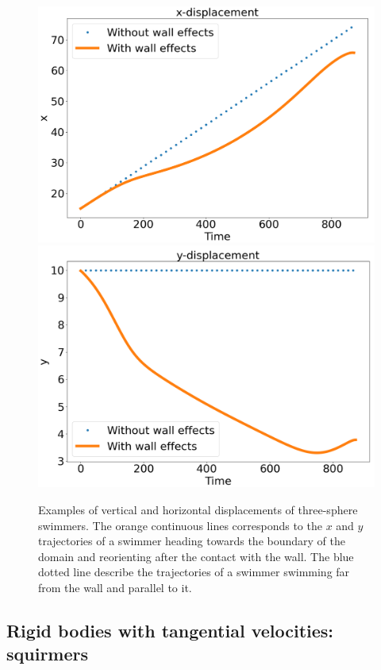 \documentclass[graybox]{svmult}
\begin{document}
\begin{figure}[h!]
    \centering
    \includegraphics[scale=0.175]{img-three-sphere-Horizontal.png}
    \includegraphics[scale=0.175]{img-three-sphere-vertical.png}
    \caption{Examples of vertical and horizontal displacements of three-sphere swimmers. The orange continuous lines corresponds to the $x$ and $y$ trajectories of a swimmer heading towards the boundary of the domain and reorienting after the contact with the wall. The blue dotted line describe the trajectories of a swimmer swimming far from the wall and parallel to it.}
    \label{fig:3ss_2}
\end{figure}

\subsection{Rigid bodies with tangential velocities: squirmers}
\end{document}
